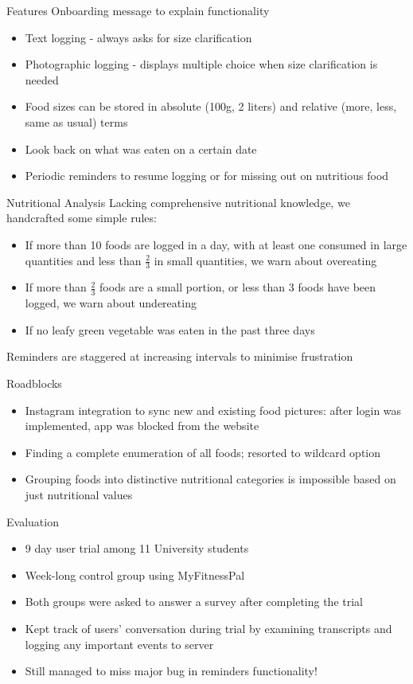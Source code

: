 \documentclass[landscape]{infslides}
\begin{document}
\begin{slide}{Features}
    Onboarding message to explain functionality
    \begin{itemize}
        \item Text logging - always asks for size clarification
        \item Photographic logging - displays multiple choice when size clarification is needed 
        \item Food sizes can be stored in absolute (100g, 2 liters) and relative (more, less, same as usual) terms
        \item Look back on what was eaten on a certain date
        \item Periodic reminders to resume logging or for missing out on nutritious food
    \end{itemize}
\end{slide}
\begin{slide}{Nutritional Analysis}
Lacking comprehensive nutritional knowledge, we handcrafted some simple rules:
    \begin{itemize}
        \item If more than 10 foods are logged in a day, with at least one consumed in large quantities and less than $\frac{2}{3}$ in small quantities, we warn about overeating
        \item If more than $\frac{2}{3}$ foods are a small portion, or less than 3 foods have been logged, we warn about undereating
        \item If no leafy green vegetable was eaten in the past three days
    \end{itemize}
    Reminders are staggered at increasing intervals to minimise frustration
\end{slide}
\begin{slide}{Roadblocks}
    \begin{itemize} 
        \item Instagram integration to sync new and existing food pictures: after login was implemented, app was blocked from the website
        \item Finding a complete enumeration of all foods; resorted to wildcard option
        \item Grouping foods into distinctive nutritional categories is impossible based on just nutritional values
    \end{itemize}
\end{slide}
\begin{slide}{Evaluation}
    \begin{itemize}
        \item 9 day user trial among 11 University students
        \item Week-long control group using MyFitnessPal
        \item Both groups were asked to answer a survey after completing the trial
        \item Kept track of users' conversation during trial by examining transcripts and logging any important events to server
        \item Still managed to miss major bug in reminders functionality!
    \end{itemize}
\end{slide}
\end{document}
